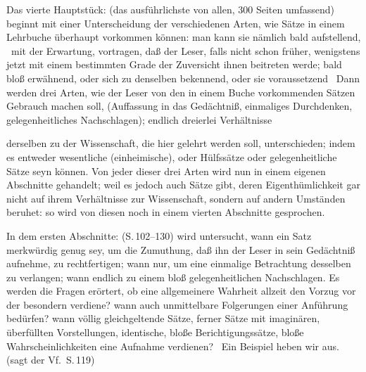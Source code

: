 Das vierte Hauptstück:  (das ausführlichste von allen, 300 Seiten umfassend) beginnt  mit einer Unterscheidung der verschiedenen Arten, wie Sätze in einem Lehrbuche überhaupt vorkommen können: man kann sie nämlich bald aufstellend, \dh\  mit der Erwartung, vortragen, daß der Leser, falls nicht schon früher, wenigstens jetzt mit einem bestimmten Grade der Zuversicht ihnen beitreten werde; bald bloß erwähnend, oder sich zu denselben bekennend, oder sie voraussetzend \usw\ Dann werden  drei Arten, wie der Leser von den in einem Buche vorkommenden Sätzen Gebrauch machen soll, (Auffassung in das Gedächtniß, einmaliges Durchdenken, gelegenheitliches Nachschlagen); endlich  dreierlei Verhältnisse \par 
derselben zu der Wissenschaft, die hier gelehrt werden soll, unterschieden; indem es entweder wesentliche (einheimische), oder Hülfssätze oder gelegenheitliche Sätze seyn können. Von jeder dieser drei Arten wird nun in einem eigenen Abschnitte gehandelt; weil es jedoch auch Sätze gibt, deren Eigenthümlichkeit gar nicht auf ihrem Verhältnisse zur Wissenschaft, sondern auf andern Umständen beruhet: so wird von diesen noch in einem vierten Abschnitte gesprochen. \par 
In dem ersten Abschnitte:  (S.\,102--130) wird untersucht, wann ein Satz merkwürdig genug sey, um die Zumuthung, daß ihn der Leser in sein Gedächtniß aufnehme, zu rechtfertigen; wann nur, um eine einmalige Betrachtung desselben zu verlangen; wann endlich zu einem bloß gelegenheitlichen Nachschlagen. Es werden die Fragen erörtert, ob eine allgemeinere Wahrheit allzeit den Vorzug vor der besondern verdiene? wann auch unmittelbare Folgerungen einer Anführung bedürfen? wann völlig gleichgeltende Sätze, ferner Sätze mit imaginären, überfüllten Vorstellungen, identische, bloße Berichtigungssätze, bloße Wahrscheinlichkeiten eine Aufnahme verdienen? \usw\ Ein Beispiel heben wir aus.  (sagt der Vf.\ S.\,119) \par 
